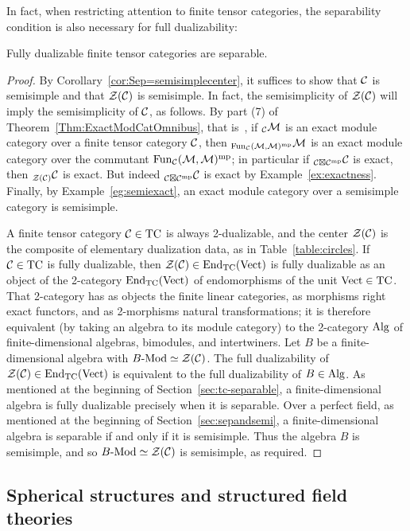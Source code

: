 \documentclass{amsart}
\begin{document}
In fact, when restricting attention to finite tensor categories, the separability condition is also necessary for full dualizability:
\begin{theorem} \label{thm:converse}
Fully dualizable finite tensor categories are separable.
\end{theorem}
\begin{proof}
By Corollary~\ref{cor:Sep=semisimplecenter}, it suffices to show that $\mathcal C$ is semisimple and that $\mathcal Z(\mathcal C)$ is semisimple.  In fact, the semisimplicity of $\mathcal Z(\mathcal C)$ will imply the semisimplicity of $\mathcal C$, as follows.  By part (7) of Theorem~\ref{Thm:ExactModCatOmnibus}, that is~\cite[Lemma 3.25]{EO-ftc}, if ${}_\mathcal C \mathcal M$ is an exact module category over a finite tensor category $\mathcal C$, then ${}_{\operatorname{Fun}_\mathcal C(\mathcal M,\mathcal M)^{\mathrm{mp}}} \mathcal M$ is an exact module category over the commutant $\operatorname{Fun}_\mathcal C(\mathcal M,\mathcal M)^{\mathrm{mp}}$; in particular if ${}_{\mathcal C \boxtimes \mathcal C^{\mathrm{mp}}} \mathcal C$ is exact, then ${}_{\mathcal Z(\mathcal C)} \mathcal C$ is exact.  But indeed ${}_{\mathcal C \boxtimes \mathcal C^{\mathrm{mp}}} \mathcal C$ is exact by Example~\ref{ex:exactness}.  Finally, by Example~\ref{eg:semiexact}, an exact module category over a semisimple category is semisimple.

A finite tensor category $\mathcal C \in \mathrm{TC}$ is always 2-dualizable, and the center $\mathcal Z(\mathcal C)$ is the composite of elementary dualization data, as in Table~\ref{table:circles}.  If $\mathcal C \in \mathrm{TC}$ is fully dualizable, then $\mathcal Z(\mathcal C) \in \operatorname{End}_{\mathrm{TC}}(\mathrm{Vect})$ is fully dualizable as an object of the 2-category $\operatorname{End}_{\mathrm{TC}}(\mathrm{Vect})$ of endomorphisms of the unit $\mathrm{Vect} \in \mathrm{TC}$.  That 2-category has as objects the finite linear categories, as morphisms right exact functors, and as 2-morphisms natural transformations; it is therefore equivalent (by taking an algebra to its module category) to the 2-category $\mathrm{Alg}$ of finite-dimensional algebras, bimodules, and intertwiners.  Let $B$ be a finite-dimensional algebra with $\Mod{B}{} \simeq \cZ(\cC)$.  The full dualizability of $\mathcal Z(\mathcal C) \in \operatorname{End}_{\mathrm{TC}}(\mathrm{Vect})$ is equivalent to the full dualizability of $B \in \mathrm{Alg}$.  As mentioned at the beginning of Section~\ref{sec:tc-separable}, a finite-dimensional algebra is fully dualizable precisely when it is separable.  Over a perfect field, as mentioned at the beginning of Section~\ref{sec:sepandsemi}, a finite-dimensional algebra is separable if and only if it is semisimple.  Thus the algebra $B$ is semisimple, and so $\Mod{B}{} \simeq \cZ(\cC)$ is semisimple, as required.
\end{proof}


\subsection{Spherical structures and structured field theories} \label{sec:spherical}
\end{document}
